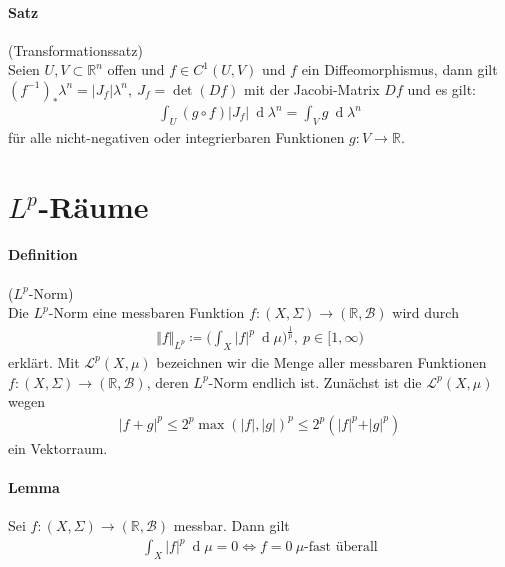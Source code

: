 \documentclass[12pt,a4paper,fleqn]{article}
\def\d{{\operatorname{d}}}
\begin{document}
\paragraph{Satz} (Transformationssatz)\\
Seien $U, V \subset \mathbb{R}^n$ offen und $f \in C^1(U, V)$ und $f$ ein Diffeomorphismus, dann gilt $(f^{-1}) _\ast \lambda^n = \vert J_f \vert \lambda^n,\ J_f = \det(Df)$
 mit der Jacobi-Matrix $Df$ und es gilt:
\begin{align*}
\int_U (g \circ f)\vert J_f \vert\ \d\lambda^n = \int_V g\ \d\lambda^n
\end{align*}
für alle nicht-negativen oder integrierbaren Funktionen $g\colon V \rightarrow \mathbb{R}$.

\section{$L^p$-Räume}

\paragraph{Definition} ($L^p$-Norm)\\
Die $L^p$-Norm eine messbaren Funktion $f\colon (X, \Sigma) \rightarrow (\mathbb{R}, \mathcal{B})$ wird durch
\begin{align*}
\Vert f \Vert _{L^p} \coloneqq \bigg( \int_X \vert f \vert ^p\ \d\mu \bigg)^{\frac{1}{p}},\ p \in [1, \infty)
\end{align*}
erklärt. Mit $\mathscr{L}^p(X, \mu)$ bezeichnen wir die Menge aller messbaren Funktionen\linebreak \mbox{$f\colon (X, \Sigma) \rightarrow (\mathbb{R}, \mathcal{B})$}, deren $L^p$-Norm endlich ist. Zunächst ist die $\mathscr{L}^p(X, \mu)$ wegen
\begin{align*}
\vert f + g \vert ^p \leq 2^p \max(\vert f \vert, \vert g \vert)^p \leq 2^p (\vert f \vert ^p + \vert g \vert ^p)
\end{align*}
ein Vektorraum.

\paragraph{Lemma} Sei $f\colon (X, \Sigma) \rightarrow (\mathbb{R}, \mathcal{B})$ messbar. Dann gilt
\begin{align*}
\int_X \vert f \vert ^p\ \d\mu = 0 \Leftrightarrow f = 0\ \mu \text{-fast überall}
\end{align*}
\end{document}
